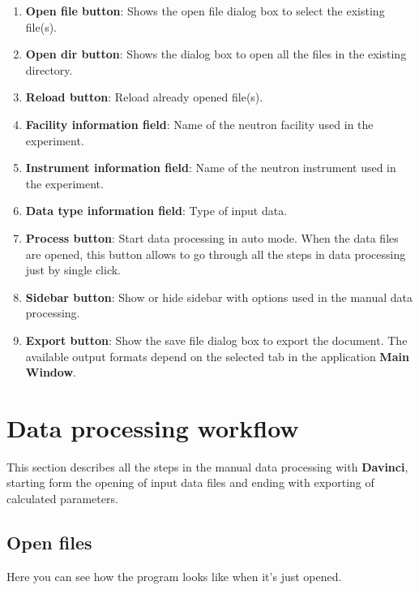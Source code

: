 \begin{enumerate}
	\item \textbf{Open file button}: Shows the open file dialog box to select the existing file(s).
	\item \textbf{Open dir button}: Shows the dialog box to open all the files in the existing directory.
	\item \textbf{Reload button}: Reload already opened file(s).
	\item \textbf{Facility information field}: Name of the neutron facility used in the experiment.
	\item \textbf{Instrument information field}: Name of the neutron instrument used in the experiment.
	\item \textbf{Data type information field}: Type of input data.
	\item \textbf{Process button}: Start data processing in auto mode. When the data files are opened, this button allows to go through all the steps in data processing just by single click.
	\item \textbf{Sidebar button}: Show or hide sidebar with options used in the manual data processing.
	\item \textbf{Export button}: Show the save file dialog box to export the document. The available output formats depend on the selected tab in the application \textbf{Main Window}. 
\end{enumerate}

\newpage
\section{Data processing workflow}

This section describes all the steps in the manual data processing with \textbf{Davinci}, starting form the opening of input data files and ending with exporting of calculated parameters.

\subsection{Open files}

Here you can see how the program looks like when it's just opened.


